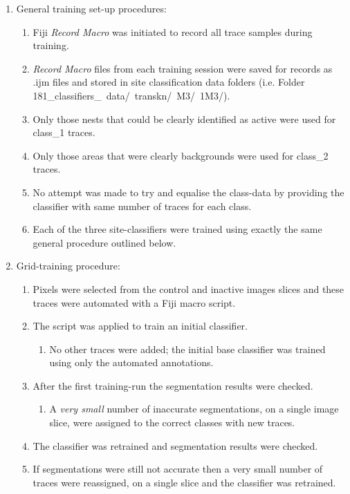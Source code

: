 \begin{enumerate}
\item General training set-up procedures:
	\begin{enumerate}
	\item \ac{Fiji} \emph{Record Macro} was initiated to record all trace samples during training.
	\item \emph{Record Macro} files from each training session were saved for records as .ijm files and stored in site classification data folders (i.e. Folder 181\_classifiers\_~data/~transkn/~M3/~1M3/).
	\item Only those nests that could be clearly identified as active were used for class\_1 traces. 
	\item Only those areas that were clearly backgrounds were used for class\_2 traces.
	\item No attempt was made to try and equalise the class-data by providing the classifier with same number of traces for each class.
	\item Each of the three site-classifiers were trained using exactly the same general procedure outlined below.
	\end{enumerate}
\item Grid-training procedure:
	\begin{enumerate}
	\item Pixels were selected from the control and inactive images slices and these traces were automated with a \ac{Fiji} macro script.
	\item The script was applied to train an initial classifier.
			\begin{enumerate}
			\item No other traces were added; the initial base classifier was trained using only the automated annotations.
			\end{enumerate}
	\item After the first training-run the segmentation results were checked.
			\begin{enumerate}
			\item A \emph{very small} number of inaccurate segmentations, on a single image slice, were assigned to the correct classes with new traces. 
			\end{enumerate}
	\item The classifier was retrained and segmentation results were checked.
	\item If segmentations were still not accurate then a very small number of traces were reassigned, on a single slice and the classifier was retrained.

\end{enumerate}
\end{enumerate}
